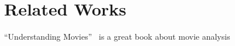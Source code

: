 \section{Related Works}
\label{sec:p1-related}

``Understanding Movies''~\cite{giannetti2005understanding} is a great book about movie analysis 


